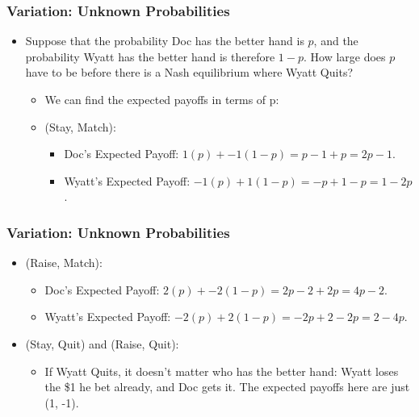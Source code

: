 
\begin{frame}
\frametitle{Variation: Unknown Probabilities}
\begin{itemize}
\item Suppose that the probability Doc has the better hand is $p$, and the probability Wyatt has the better hand is therefore $1 - p$. How large does $p$ have to be before there is a Nash equilibrium where Wyatt Quits?
\begin{itemize}
	\item We can find the expected payoffs in terms of p:
	\item (Stay, Match):
	\begin{itemize}
		\item Doc's Expected Payoff: $1(p) + -1(1 - p) = p - 1 + p = 2p - 1$.
		\item Wyatt's Expected Payoff: $-1(p) + 1(1 - p) = -p + 1 - p = 1 - 2p$.
	\end{itemize}
\end{itemize}
\end{itemize}
\end{frame}


\begin{frame}
\frametitle{Variation: Unknown Probabilities}
\begin{itemize}
	\item (Raise, Match):
	\begin{itemize}
		\item Doc's Expected Payoff: $2(p) + -2(1 - p) = 2p - 2 + 2p = 4p - 2$.
		\item Wyatt's Expected Payoff: $-2(p) + 2(1 - p) = -2p + 2 - 2p = 2 - 4p$.
	\end{itemize}
	\item (Stay, Quit) and (Raise, Quit):
	\begin{itemize}
		\item If Wyatt Quits, it doesn't matter who has the better hand: Wyatt loses the \$1 he bet already, and Doc gets it. The expected payoffs here are just (1, -1).
	\end{itemize}
\end{itemize}
\end{frame}


